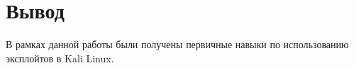\chapter{Вывод}

В рамках данной работы были получены первичные навыки по использованию эксплойтов в Kali Linux.